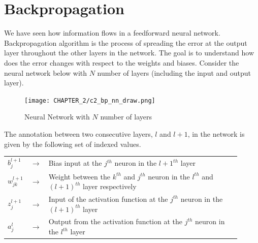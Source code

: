 \section{Backpropagation}
We have seen how information flows in a feedforward neural network. Backpropagation algorithm is the process of spreading the error at the output layer throughout the other layers in the network. The goal is to understand how does the error changes with respect to the weights and biases. Consider the neural network below with $N$ number of layers (including the input and output layer).\vspace{10mm}
\begin{figure}[H]
  \centering
  \texttt{[image: CHAPTER\_2/c2\_bp\_nn\_draw.png]}
  \vspace{10mm}
  \caption{Neural Network with $N$ number of layers}
  \label{fig:bp_nn_complete}
\end{figure}\vspace{10mm}
\noindent The annotation between two consecutive layers, $l$ and $l+1$, in the network is given by the following set of indexed values.
\begin{center}
  \begin{tabular}{p{0.06\linewidth} p{0.03\linewidth} p{0.82\linewidth}}
    $b_j^{l+1}$ & $\rightarrow$ & Bias input at the $j^{th}$ neuron in the ${l+1}^{th}$ layer \\ 
    $w_{jk}^{l+1}$ & $\rightarrow$ & Weight between the $k^{th}$ and $j^{th}$ neuron in the $l^{th}$ and ${(l+1)}^{th}$ layer respectively \\  
    $z_j^{l+1}$ &$\rightarrow$& Input of the activation function at the $j^{th}$ neuron in the $(l+1)^{th}$ layer \\
    $a_j^l$ & $\rightarrow$ & Output from the activation function at the $j^{th}$ neuron in the $l^{th}$ layer
  \end{tabular}
\end{center}
